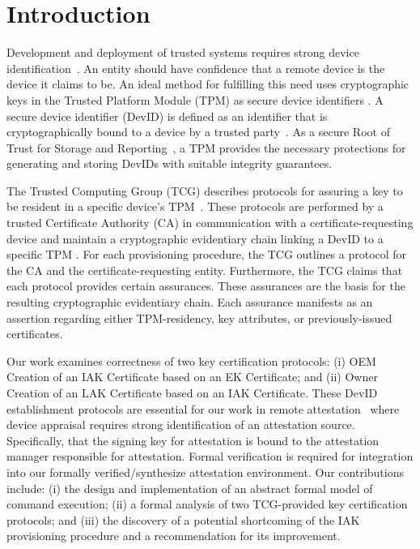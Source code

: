 \documentclass[runningheads]{llncs}
\begin{document}
\section{Introduction}
Development and deployment of trusted systems requires strong device
identification~\citep{Martin:08:The-ten-page-in}. An entity should
have confidence that a remote device is the device it claims to be. An
ideal method for fulfilling this need uses cryptographic keys in the
Trusted Platform Module (TPM) as secure device identifiers
\citep{DevIDSpec-TCG}. A secure device identifier (DevID) is defined
as an identifier that is cryptographically bound to a device by a
trusted party~\citep{DevIDSpec-IEEE}.  As a secure Root of Trust for
Storage and Reporting~\citep{TPMSpec}, a TPM provides the necessary
protections for generating and storing DevIDs with suitable integrity
guarantees.

The Trusted Computing Group (TCG) describes protocols for assuring a
key to be resident in a specific device's
TPM~\citep{DevIDSpec-TCG}. These protocols are performed by a trusted
Certificate Authority (CA) in communication with a
certificate-requesting device and maintain a cryptographic evidentiary
chain linking a DevID to a specific TPM \citep{DevIDSpec-TCG}.  For
each provisioning procedure, the TCG outlines a protocol for the CA
and the certificate-requesting entity. Furthermore, the TCG claims
that each protocol provides certain assurances. These assurances are
the basis for the resulting cryptographic evidentiary chain.  Each
assurance manifests as an assertion regarding either TPM-residency,
key attributes, or previously-issued certificates.

Our work examines correctness of two key certification protocols: (i)
OEM Creation of an IAK Certificate based on an EK Certificate; and
(ii) Owner Creation of an LAK Certificate based on an IAK
Certificate. These DevID establishment protocols are essential for our
work in remote
attestation~\cite{Coker::Principles-of-R,petz2022innovations} where
device appraisal requires strong identification of an attestation
source. Specifically, that the signing key for attestation is bound to
the attestation manager responsible for attestation.  Formal
verification is required for integration into our formally
verified/synthesize attestation
environment\citep{petz2022innovations}.  Our contributions include:
(i) the design and implementation of an abstract formal model of
command execution; (ii) a formal analysis of two TCG-provided key
certification protocols; and (iii) the discovery of a potential
shortcoming of the IAK provisioning procedure and a recommendation for
its improvement.
\end{document}
